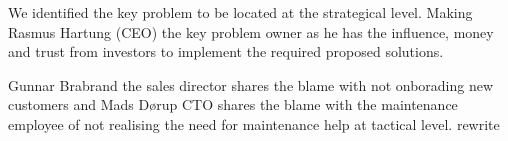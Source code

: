 \noindent We identified the key problem to be located at the strategical level. Making Rasmus Hartung (CEO) the key problem owner as he has the influence, money and trust from investors to implement the required proposed solutions.\newline

\noindent Gunnar Brabrand the sales director shares the blame with not onborading new customers and Mads Dørup CTO shares the blame with the maintenance employee of not realising the need for maintenance help at tactical level. \color{red} rewrite \color{black} 
